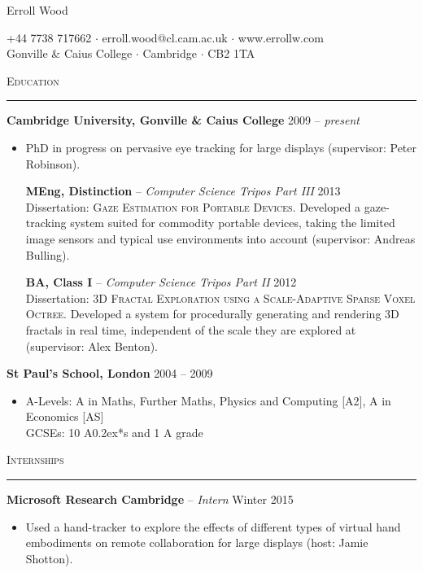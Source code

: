 \documentclass{article}
\begin{document}
\begin{center}
  {\Large Erroll Wood}
  
  \small{
	  +44 7738 717662 $\cdot$ erroll.wood@cl.cam.ac.uk $\cdot$ www.errollw.com \\
	  Gonville \& Caius College $\cdot$ Cambridge $\cdot$ CB2 1TA \\
  }
\end{center} \medskip 

\textsc{Education} \smallskip \hrule \smallskip
\textbf{Cambridge University, Gonville \& Caius College} \hfill 2009 -- \emph{present} \\[-4mm]

\begin{itemize}
  \item[]
  PhD in progress on pervasive eye tracking for large displays (supervisor: Peter Robinson). \
  
  \textbf{MEng, Distinction} -- \emph{Computer Science Tripos Part III} \hfill 2013 \\
  Dissertation: \textsc{Gaze Estimation for Portable Devices}. Developed a
  gaze-tracking system suited for commodity portable devices, taking the limited image sensors and typical use environments into account (supervisor: Andreas Bulling).

  \textbf{BA, Class I} -- \emph{Computer Science Tripos Part II} \hfill 2012 \\
  Dissertation: \textsc{3D Fractal Exploration using a Scale-Adaptive Sparse Voxel Octree}. Developed a system for procedurally generating and rendering 3D fractals in real time, independent of the scale they are explored at (supervisor: Alex Benton).
\end{itemize} \smallskip

\textbf{St Paul's School, London} \hfill 2004 -- 2009 \\[-6mm]
\begin{itemize}
  \item[]
  A-Levels: A in Maths, Further Maths, Physics and Computing [A2], A in Economics [AS] \\
  GCSEs: 10 A\raise0.2ex\hbox{*}s and 1 A grade
\end{itemize} \bigskip

\textsc{Internships} \smallskip \hrule \smallskip

\textbf{Microsoft Research Cambridge} -- \emph{Intern} \hspace*{\fill} Winter
2015 \\[-6mm]
\begin{itemize}
  \item[]
  Used a hand-tracker to explore the effects of different types of virtual hand embodiments on remote collaboration for large displays (host: Jamie Shotton).
\end{itemize} \smallskip
\end{document}
